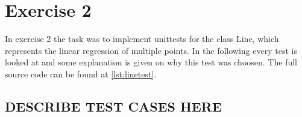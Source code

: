 \chapter{Exercise 2}
In exercise 2 the task was to implement unittests for the class Line, which represents the linear regression of multiple points. In the following every test is looked at and some explanation is given on why this test was choosen. The full source code can be found at \ref{lst:linetest}.

\section{DESCRIBE TEST CASES HERE}